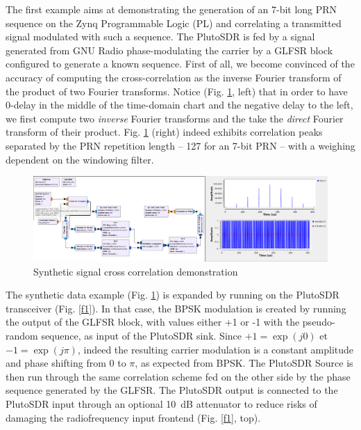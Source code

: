 \documentclass{article}
\begin{document}
The first example aims at demonstrating the generation of an 7-bit long PRN sequence on the
Zynq Programmable Logic (PL) and correlating a transmitted signal modulated with such a sequence.
The PlutoSDR is fed by a signal generated from GNU Radio phase-modulating the carrier by
a GLFSR block configured to generate a known sequence. First of all, we become convinced of the 
accuracy of computing the cross-correlation as the inverse Fourier transform of the 
product of two Fourier transforms. Notice (Fig. \ref{f0}, left) that in order to have 0-delay in the middle 
of the time-domain chart and the negative delay to the left, we first compute two {\em inverse} Fourier 
transforms and the take the {\em direct} Fourier transform of their product. Fig. \ref{f0} (right) indeed exhibits
correlation peaks separated by the PRN repetition length -- 127 for an 7-bit PRN -- with a weighing dependent on
the windowing filter.

\begin{figure}[h!tb]
\includegraphics[width=\linewidth]{xcorr_pluto1.png}
\caption{Synthetic signal cross correlation demonstration}
\label{f0}
\end{figure}

The synthetic data example (Fig. \ref{f0}) is expanded by running on the PlutoSDR transceiver (Fig. \ref{f1}). In
that case, the BPSK modulation is created by running the output of the GLFSR block, with values either +1 or -1
with the pseudo-random sequence, as input of the PlutoSDR sink. Since $+1=\exp(j0)$ et $-1=\exp(j\pi)$, indeed
the resulting carrier modulation is a constant amplitude and phase shifting from $0$ to $\pi$, as expected
from BPSK. The PlutoSDR Source is then run through the same correlation scheme fed on the other side by the 
phase sequence generated by the GLFSR. The PlutoSDR output is connected to the PlutoSDR input through an optional
10~dB attenuator to reduce risks of damaging the radiofrequency input frontend (Fig. \ref{f1}, top).
\end{document}

